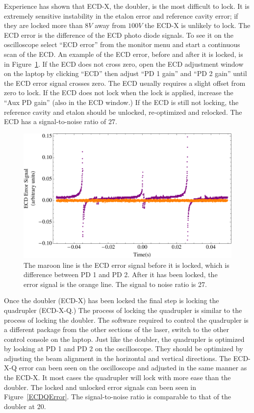 \documentclass[prb,preprint]{revtex4-1}
\begin{document}
Experience has shown that ECD-X, the doubler, is the most difficult to lock. It is extremely sensitive instability in the etalon error and reference cavity error; if they are locked more than $8 V$ away from $100 V$ the ECD-X is unlikely to lock. The ECD error is the difference of the ECD photo diode signals. To see it on the oscilloscope select ``ECD error'' from the monitor menu and start a continuous scan of the ECD. An example of the ECD error, before and after it is locked, is in Figure~\ref{ECDError}. If the ECD does not cross zero, open the ECD adjustment window on the laptop by clicking ``ECD'' then adjust ``PD 1 gain'' and ``PD 2 gain'' until the ECD error signal crosses zero. The ECD usually requires a slight offset from zero to lock. If the ECD does not lock when the lock is applied, increase the ``Aux PD gain'' (also in the ECD window.) If the ECD is still not locking, the reference cavity and etalon should be unlocked, re-optimized and relocked. The ECD has a signal-to-noise ratio of 27.

\begin{figure}[h!]
\centering
\includegraphics[width=6in]{ECDError.pdf}
\caption{The maroon line is the ECD error signal before it is locked, which is difference between PD 1 and PD 2. After it has been locked, the error signal is the orange line. The signal to noise ratio is 27.}
\label{ECDError}
\end{figure}

Once the doubler (ECD-X) has been locked the final step is locking the quadrupler (ECD-X-Q.) The process of locking the quadrupler is similar to the process of locking the doubler. The software required to control the quadrupler is a different package from the other sections of the laser, switch to the other control console on the laptop. Just like the doubler, the quadrupler is optimized by looking at PD 1 and PD 2 on the oscilloscope. They should be optimized by adjusting the beam alignment in the horizontal and vertical directions. The ECD-X-Q error can been seen on the oscilloscope and adjusted in the same manner as the ECD-X. It most cases the quadrupler will lock with more ease than the doubler. The locked and unlocked error signals can been seen in Figure~\ref{ECDQError}. The signal-to-noise ratio is comparable to that of the doubler at 20.
\end{document}
